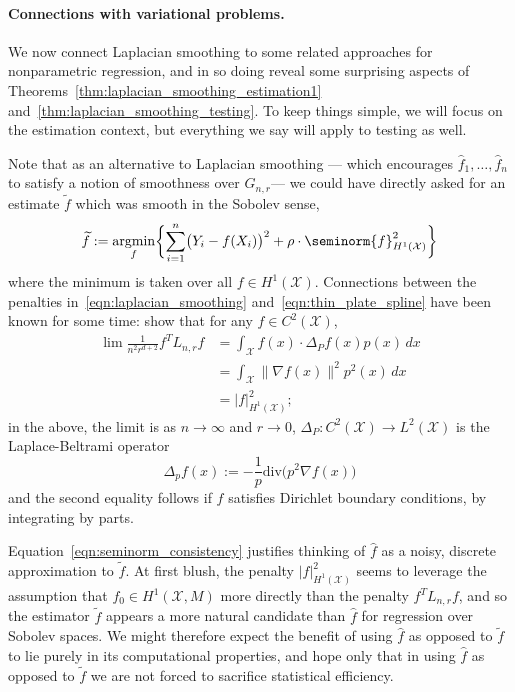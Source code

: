 \documentclass[twoside]{article}
\newcommand{\1}{\mathbf{1}}
\DeclareMathOperator*{\argmin}{argmin}
\newcommand{\Lap}{L}
\newcommand{\Xset}{\mathcal{X}}
\newcommand{\Leb}{L}
\newcommand{\dive}{\mathrm{div}}
\newcommand{\wt}[1]{\widetilde{#1}}
\newcommand{\wh}[1]{\widehat{#1}}
\theoremstyle{definition}
\theoremstyle{remark}
\begin{document}
\paragraph{Connections with variational problems.}
We now connect Laplacian smoothing to some related approaches for nonparametric regression, and in so doing reveal some surprising aspects of Theorems~\ref{thm:laplacian_smoothing_estimation1} and~\ref{thm:laplacian_smoothing_testing}. To keep things simple, we will focus on the estimation context, but everything we say will apply to testing as well. 

Note that as an alternative to Laplacian smoothing --- which encourages $\wh{f}_1,\ldots,\wh{f}_n$ to satisfy a notion of smoothness over $G_{n,r}$--- we could have directly asked for an estimate $\wt{f}$ which was smooth in the Sobolev sense,
\begin{equation}
\label{eqn:thin_plate_spline}
\wt{f} := \argmin_{f} \biggl\{\sum_{i = 1}^{n} \bigl(Y_i - f(X_i)\bigr)^2 + \rho \cdot \seminorm{f}_{H^{1}(\Xset)}^2\biggr\}
\end{equation}
where the minimum is taken over all $f \in H^1(\Xset)$. Connections between the penalties in~\eqref{eqn:laplacian_smoothing} and~\eqref{eqn:thin_plate_spline} have been known for some time: \cite{bousquet03} show that for any $f \in C^2(\Xset)$, 
\begin{equation}
\label{eqn:seminorm_consistency}
\begin{aligned}
\lim \frac{1}{n^2 r^{d + 2}} f^T \Lap_{n,r} f & = \int_{\Xset} f(x) \cdot \Delta_Pf(x) p(x) \,dx \\
& = \int_{\Xset} \|\nabla f(x)\|^2 p^2(x) \,dx \\
& = |f|_{H^1(\Xset)}^2;
\end{aligned}
\end{equation}
in the above, the limit is as $n \to \infty$ and $r \to 0$, $\Delta_P: C^2(\Xset) \to \Leb^2(\Xset)$ is the Laplace-Beltrami operator
\begin{equation*}
\Delta_pf(x) := -\frac{1}{p} \dive\bigl(p^2\nabla f(x))
\end{equation*}
and the second equality follows if $f$ satisfies Dirichlet boundary conditions, by integrating by parts.

Equation~\eqref{eqn:seminorm_consistency} justifies thinking of $\wh{f}$ as a noisy, discrete approximation to $\wt{f}$. At first blush, the penalty $|f|_{H^1(\Xset)}^2$ seems to leverage the assumption that $f_0 \in H^1(\Xset,M)$ more directly than the penalty $f^T \Lap_{n,r} f$, and so the estimator $\wt{f}$ appears a more natural candidate than $\wh{f}$ for regression over Sobolev spaces. We might therefore expect the benefit of using $\wh{f}$ as opposed to $\wt{f}$ to lie purely in its computational properties, and hope only that in using $\wh{f}$ as opposed to $\wt{f}$ we are not forced to sacrifice statistical efficiency.
\end{document}
